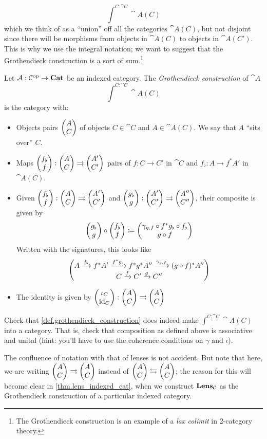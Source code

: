 \documentclass[DynamicalBook]{subfiles}
\begin{document}
$$\int^{C : \cat{C}} \cat{A}(C)$$
which we think of as a ``union'' off all the categories $\cat{A}(C)$, but not
disjoint since there will be morphisms from objects in $\cat{A}(C)$ to objects
in $\cat{A}(C')$. This is why we use the integral notation; we want to suggest
that the Grothendieck construction is a sort of sum.\footnote{The Grothendieck
  construction is an example of a \emph{lax colimit} in 2-category theory.}
\begin{definition}\label{def.grothendieck_construction}
  Let $\mathcal{A} : \mathcal{C}^{\textnormal{op}} \to \textbf{Cat}$ be an indexed category. The
  \emph{Grothendieck construction} of $\cat{A}$
  $$\int^{C : \cat{C}} \cat{A}(C)$$
  is the category with:
  \begin{itemize}
    \item Objects pairs $\begin{pmatrix}{A} \\ {C} \end{pmatrix}$ of objects $C \in \cat{C}$ and $A \in
      \cat{A}(C)$. We say that $A$ ``sits over'' $C$.
    \item Maps $\begin{pmatrix}{f_{\flat}} \\ {f} \end{pmatrix} : \begin{pmatrix}{A} \\ {C} \end{pmatrix} \rightrightarrows
      \begin{pmatrix}{A'} \\ {C'} \end{pmatrix}$ pairs of $f : C \to C'$ in $\cat{C}$ and $f_{\flat} :
      A \to f^{\ast}A'$ in $\cat{A}(C)$.
    \item Given $\begin{pmatrix}{f_{\flat}} \\ {f} \end{pmatrix} : \begin{pmatrix}{A} \\ {C} \end{pmatrix} \rightrightarrows
      \begin{pmatrix}{A'} \\ {C'} \end{pmatrix}$ and $\begin{pmatrix}{g_{\flat}} \\ {g} \end{pmatrix} : \begin{pmatrix}{A'} \\ {C'} \end{pmatrix} \rightrightarrows
      \begin{pmatrix}{A''} \\ {C''} \end{pmatrix}$, their composite is given by
      $$\begin{pmatrix}{g_{\flat}} \\ {g} \end{pmatrix} \circ \begin{pmatrix}{f_{\flat}} \\ {f} \end{pmatrix} \coloneqq \begin{pmatrix}{\gamma_{g, f}
        \circ f^{\ast}g_{\flat}
      \circ f_{\flat}} \\ {g \circ f} \end{pmatrix}$$
    Written with the signatures, this looks like
    $$\begin{pmatrix}{A \xrightarrow{f_{\flat}} f^{\ast}A' \xrightarrow{f^{\ast}g_{\flat}}
      f^{\ast}g^{\ast}A'' \xrightarrow{\gamma_{g, f}} (g \circ f)^\ast A''} \\ {C \xrightarrow{f} C' \xrightarrow{g} C''} \end{pmatrix}$$
    \item The identity is given by $\begin{pmatrix}{\iota_C} \\ {\mathrm{id}_C} \end{pmatrix} : \begin{pmatrix}{A} \\ {C} \end{pmatrix}
      \rightrightarrows \begin{pmatrix}{A} \\ {C} \end{pmatrix}$
  \end{itemize}
\end{definition}

\begin{exercise}
  Check that \cref{def.grothendieck_construction} does indeed make $\int^{C :
    \cat{C}} \cat{A}(C)$ into a category. That is, check that composition as
  defined above is associative and unital (hint: you'll have to use the
  coherence conditions on $\gamma$ and $\iota$).
\end{exercise}

The confluence of notation with that of lenses is not accident. But note that
here, we are writing $\begin{pmatrix}{A} \\ {C} \end{pmatrix} \rightrightarrows \begin{pmatrix}{A} \\ {C} \end{pmatrix}$ instead of
$\begin{pmatrix}{A} \\ {C} \end{pmatrix} \leftrightarrows \begin{pmatrix}{A} \\ {C} \end{pmatrix}$; the reason for this will become clear in
\cref{thm.lens_indexed_cat}, when we construct $\textbf{Lens}_{\mathcal{C}}$ as the
Grothendieck construction of a particular indexed category.
\end{document}
